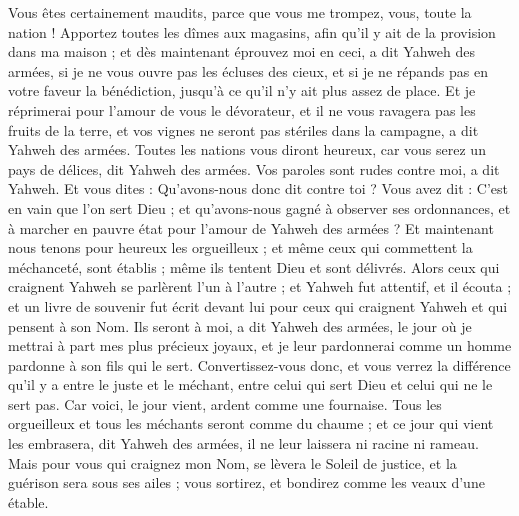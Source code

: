 \begin{multicols}{2}
Vous êtes certainement maudits, parce que vous me trompez, vous, toute la nation !
Apportez toutes les dîmes aux magasins, afin qu'il y ait de la provision dans ma maison ; et dès maintenant éprouvez moi en ceci, a dit Yahweh des armées, si je ne vous ouvre pas les écluses des cieux, et si je ne répands pas en votre faveur la bénédiction, jusqu'à ce qu'il n'y ait plus assez de place.
Et je réprimerai pour l'amour de vous le dévorateur, et il ne vous ravagera pas les fruits de la terre, et vos vignes ne seront pas stériles dans la campagne, a dit Yahweh des armées.
Toutes les nations vous diront heureux, car vous serez un pays de délices, dit Yahweh des armées.
Vos paroles sont rudes contre moi, a dit Yahweh. Et vous dites : Qu'avons-nous donc dit contre toi ?
Vous avez dit : C'est en vain que l'on sert Dieu ; et qu'avons-nous gagné à observer ses ordonnances, et à marcher en pauvre état pour l'amour de Yahweh des armées ?
Et maintenant nous tenons pour heureux les orgueilleux ; et même ceux qui commettent la méchanceté, sont établis ; même ils tentent Dieu et sont délivrés.
Alors ceux qui craignent Yahweh se parlèrent l'un à l'autre ; et Yahweh fut attentif, et il écouta ; et un livre de souvenir fut écrit devant lui pour ceux qui craignent Yahweh et qui pensent à son Nom.
Ils seront à moi, a dit Yahweh des armées, le jour où je mettrai à part mes plus précieux joyaux, et je leur pardonnerai comme un homme pardonne à son fils qui le sert.
Convertissez-vous donc, et vous verrez la différence qu'il y a entre le juste et le méchant, entre celui qui sert Dieu et celui qui ne le sert pas.
\VerseOne{}Car voici, le jour vient, ardent comme une fournaise. Tous les orgueilleux et tous les méchants seront comme du chaume ; et ce jour qui vient les embrasera, dit Yahweh des armées, il ne leur laissera ni racine ni rameau.
Mais pour vous qui craignez mon Nom, se lèvera le Soleil de justice, et la guérison sera sous ses ailes ; vous sortirez, et bondirez comme les veaux d'une étable.

\end{multicols}

